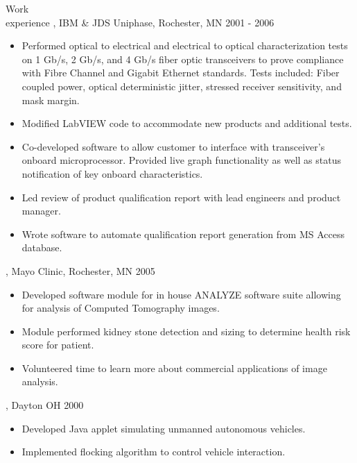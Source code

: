 \begin{category}{Work \\experience}
, IBM \& JDS Uniphase, Rochester, MN  2001 - 2006 
\begin{itemize}
\item Performed optical to electrical and electrical to optical characterization tests on 1 Gb/s, 2 Gb/s, and 4 Gb/s fiber optic transceivers to prove compliance with Fibre Channel and Gigabit Ethernet standards. Tests included: Fiber coupled power, optical deterministic jitter, stressed receiver sensitivity, and mask margin.
\item Modified LabVIEW code to accommodate new products and additional tests.
\item Co-developed software to allow customer to interface with transceiver's onboard microprocessor. Provided live graph functionality as well as status notification of key onboard characteristics.
\item Led review of product qualification report with lead engineers and product manager.
\item Wrote software to automate qualification report generation from MS Access database.
\end{itemize}


, Mayo Clinic, Rochester, MN  2005 
\begin{itemize}
\item Developed software module for in house ANALYZE software suite allowing for analysis of Computed Tomography images. 
\item Module performed kidney stone detection and sizing to determine health risk score for patient.
\item Volunteered time to learn more about commercial applications of image analysis. 
\end{itemize}


, Dayton OH  2000 
\begin{itemize}
\item Developed Java applet simulating unmanned autonomous vehicles.
\item Implemented flocking algorithm to control vehicle interaction.
\end{itemize}


\end{category}
